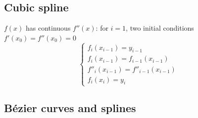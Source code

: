\subsection*{Cubic spline}
$f(x)$ has continuous $f''(x)$: for $i=1$, two initial conditions $f'(x_0) = f''(x_0) = 0$
\[
    \left\{
        \begin{array}{l}
            f_i(x_{i-1}) = y_{i-1}\\
            f_i(x_{i-1}) = f_{i-1}(x_{i-1})\\
            f''_i(x_{i-1}) = f''_{i-1}(x_{i-1})\\
            f_i(x_i) = y_i
        \end{array}
     \right.  
\]
\subsection*{Bézier curves and splines}

